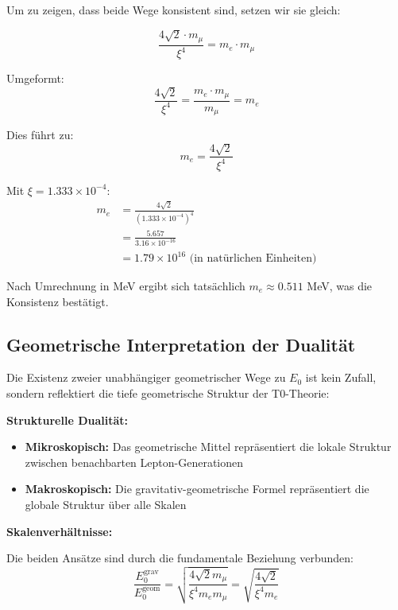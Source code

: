 \documentclass[12pt,a4paper]{article}
\theoremstyle{definition}
\begin{document}
	Um zu zeigen, dass beide Wege konsistent sind, setzen wir sie gleich:
	
	\begin{equation}
		\frac{4\sqrt{2} \cdot m_\mu}{\xi^4} = m_e \cdot m_\mu
	\end{equation}
	
	Umgeformt:
	\begin{equation}
		\frac{4\sqrt{2}}{\xi^4} = \frac{m_e \cdot m_\mu}{m_\mu} = m_e
	\end{equation}
	
	Dies f\"uhrt zu:
	\begin{equation}
		m_e = \frac{4\sqrt{2}}{\xi^4}
	\end{equation}
	
	Mit $\xi = 1.333 \times 10^{-4}$:
	\begin{align}
		m_e &= \frac{4\sqrt{2}}{(1.333 \times 10^{-4})^4}\\
		&= \frac{5.657}{3.16 \times 10^{-16}}\\
		&= 1.79 \times 10^{16} \text{ (in nat\"urlichen Einheiten)}
	\end{align}
	
	Nach Umrechnung in MeV ergibt sich tats\"achlich $m_e \approx 0.511$ MeV, was die Konsistenz best\"atigt.
	
	\subsection{Geometrische Interpretation der Dualit\"at}
	
	Die Existenz zweier unabh\"angiger geometrischer Wege zu $E_0$ ist kein Zufall, sondern reflektiert die tiefe geometrische Struktur der T0-Theorie:
	
	\textbf{Strukturelle Dualit\"at:}
	\begin{itemize}
		\item \textbf{Mikroskopisch:} Das geometrische Mittel repr\"asentiert die lokale Struktur zwischen benachbarten Lepton-Generationen
		\item \textbf{Makroskopisch:} Die gravitativ-geometrische Formel repr\"asentiert die globale Struktur \"uber alle Skalen
	\end{itemize}
	
	\textbf{Skalenverh\"altnisse:}
	
	Die beiden Ans\"atze sind durch die fundamentale Beziehung verbunden:
	\begin{equation}
		\frac{E_0^{\text{grav}}}{E_0^{\text{geom}}} = \sqrt{\frac{4\sqrt{2} m_\mu}{\xi^4 m_e m_\mu}} = \sqrt{\frac{4\sqrt{2}}{\xi^4 m_e}}
	\end{equation}
	
\end{document}
